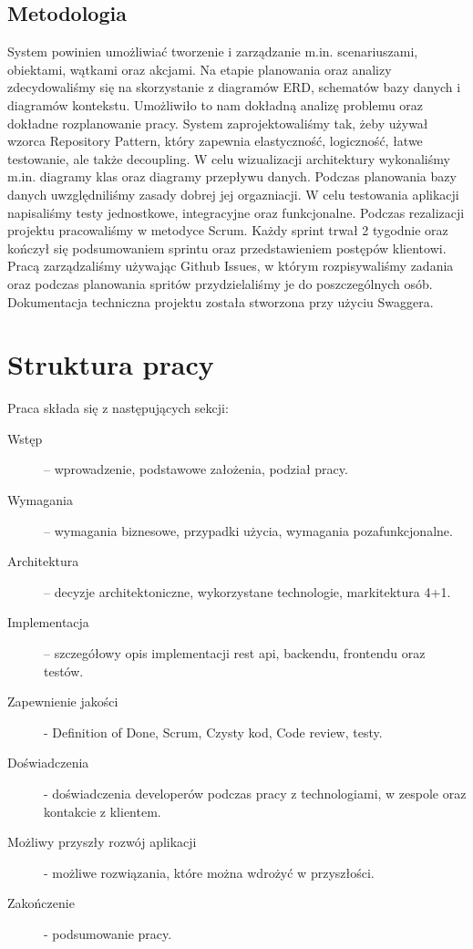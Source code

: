 \subsection{Metodologia}
System powinien umożliwiać tworzenie i zarządzanie m.in. scenariuszami, obiektami, wątkami oraz akcjami. Na etapie planowania oraz analizy
zdecydowaliśmy się na skorzystanie z diagramów ERD, schematów bazy danych i diagramów kontekstu. Umożliwiło to nam dokładną analizę problemu oraz dokładne rozplanowanie pracy.
System zaprojektowaliśmy tak, żeby używał wzorca Repository Pattern, który zapewnia elastyczność, logiczność, łatwe testowanie, ale także decoupling. W celu wizualizacji architektury wykonaliśmy
m.in. diagramy klas oraz diagramy przepływu danych. Podczas planowania bazy danych uwzględniliśmy zasady dobrej jej orgazniacji. W celu testowania aplikacji napisaliśmy testy jednostkowe, integracyjne oraz funkcjonalne.
Podczas rezalizacji projektu pracowaliśmy w metodyce Scrum. Każdy sprint trwał 2 tygodnie oraz kończył się podsumowaniem sprintu oraz przedstawieniem postępów klientowi. Pracą zarządzaliśmy używając Github Issues, w którym rozpisywaliśmy zadania oraz podczas planowania spritów przydzielaliśmy je do poszczególnych osób.
Dokumentacja techniczna projektu została stworzona przy użyciu Swaggera.

\section{Struktura pracy}
Praca składa się z następujących sekcji:
\begin{description}
    \item[Wstęp] -- wprowadzenie, podstawowe założenia, podział pracy.
    \item[Wymagania] -- wymagania biznesowe, przypadki użycia, wymagania pozafunkcjonalne.
    \item[Architektura] -- decyzje architektoniczne, wykorzystane technologie, markitektura 4+1.
    \item[Implementacja] -- szczegółowy opis implementacji rest api, backendu, frontendu oraz testów.
    \item[Zapewnienie jakości] - Definition of Done, Scrum, Czysty kod, Code review, testy.
    \item[Doświadczenia] - doświadczenia developerów podczas pracy z technologiami, w zespole oraz kontakcie z klientem.
    \item[Możliwy przyszły rozwój aplikacji] - możliwe rozwiązania, które można wdrożyć w przyszłości.
    \item[Zakończenie] - podsumowanie pracy.
\end{description}

